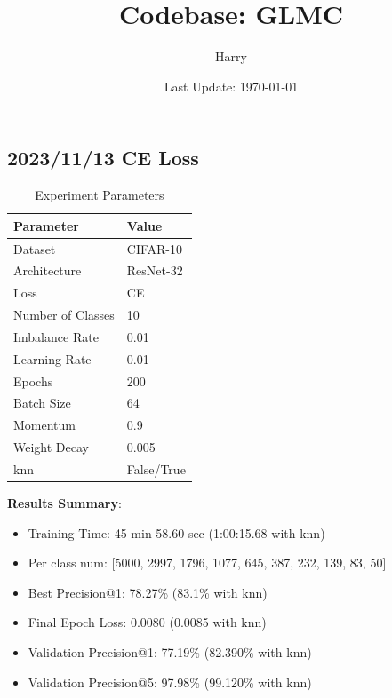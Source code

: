 \documentclass{article}
\title{Codebase: GLMC}
\author{Harry}
\date{Last Update: \today}
\begin{document}
\maketitle

\begin{multicols}{2} %
\section{2023/11/13 CE Loss}
\begin{table}[H]
\centering
\caption{Experiment Parameters}
\label{tab:parameters}
\begin{tabular}{ll}
\toprule
Parameter & Value \\
\midrule
Dataset & CIFAR-10 \\
Architecture & ResNet-32 \\
Loss & CE \\
Number of Classes & 10 \\
Imbalance Rate & 0.01 \\
Learning Rate & 0.01 \\
Epochs & 200 \\
Batch Size & 64 \\
Momentum & 0.9 \\
Weight Decay & 0.005 \\
knn & False/True \\
\bottomrule
\end{tabular}
\end{table}

\textbf{Results Summary}:
\begin{itemize}
    \item Training Time: 45 min 58.60 sec (1:00:15.68 with knn)
    \item Per class num: [5000, 2997, 1796, 1077, 645, 387, 232, 139, 83, 50]
    \item Best Precision@1: 78.27\%  (83.1\% with knn)
    \item Final Epoch Loss: 0.0080 (0.0085 with knn)
    \item Validation Precision@1: 77.19\% (82.390\% with knn)
    \item Validation Precision@5: 97.98\% (99.120\% with knn)
\end{itemize}


\end{multicols}
\end{document}
